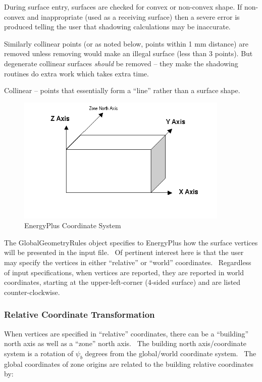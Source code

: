 During surface entry, surfaces are checked for convex or non-convex shape. If non-convex and inappropriate (used as a receiving surface) then a severe error is produced telling the user that shadowing calculations may be inaccurate.

Similarly collinear points (or as noted below, points within 1 mm distance) are removed unless removing would make an illegal surface (less than 3 points). But degenerate collinear surfaces \emph{should} be removed -- they make the shadowing routines do extra work which takes extra time.

Collinear -- points that essentially form a ``line'' rather than a surface shape.

\begin{figure}[hbtp] %
\centering
\includegraphics[width=0.9\textwidth, height=0.9\textheight, keepaspectratio=true]{media/image605.png}
\caption{EnergyPlus Coordinate System \protect \label{fig:energyplus-coordinate-system}}
\end{figure}

The GlobalGeometryRules object specifies to EnergyPlus how the surface vertices will be presented in the input file.~ Of pertinent interest here is that the user may specify the vertices in either ``relative'' or ``world'' coordinates.~ Regardless of input specifications, when vertices are reported, they are reported in world coordinates, starting at the upper-left-corner (4-sided surface) and are listed counter-clockwise.

\subsubsection{Relative Coordinate Transformation}\label{relative-coordinate-transformation}

When vertices are specified in ``relative'' coordinates, there can be a ``building'' north axis as well as a ``zone'' north axis.~ The building north axis/coordinate system is a rotation of $\psi_b$ degrees from the global/world coordinate system.~ The global coordinates of zone origins are related to the building relative coordinates by:


